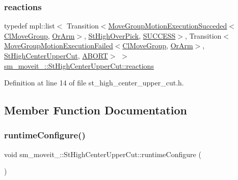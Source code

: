 \subsubsection{\texorpdfstring{reactions}{reactions}}
{\footnotesize\ttfamily typedef mpl\+::list$<$ Transition$<$\hyperlink{structmoveit__z__client_1_1MoveGroupMotionExecutionSucceded}{Move\+Group\+Motion\+Execution\+Succeded}$<$\hyperlink{classmoveit__z__client_1_1ClMoveGroup}{Cl\+Move\+Group}, \hyperlink{classsm__moveit__3_1_1OrArm}{Or\+Arm}$>$, \hyperlink{structsm__moveit__3_1_1StHighOverPick}{St\+High\+Over\+Pick}, \hyperlink{classSUCCESS}{S\+U\+C\+C\+E\+SS}$>$, Transition$<$\hyperlink{structmoveit__z__client_1_1MoveGroupMotionExecutionFailed}{Move\+Group\+Motion\+Execution\+Failed}$<$\hyperlink{classmoveit__z__client_1_1ClMoveGroup}{Cl\+Move\+Group}, \hyperlink{classsm__moveit__3_1_1OrArm}{Or\+Arm}$>$, \hyperlink{structsm__moveit__3_1_1StHighCenterUpperCut}{St\+High\+Center\+Upper\+Cut}, \hyperlink{classABORT}{A\+B\+O\+RT}$>$ $>$ \hyperlink{structsm__moveit__3_1_1StHighCenterUpperCut_a4985c365500d6acc2991ecf20c4476e7}{sm\+\_\+moveit\+\_\+::\+St\+High\+Center\+Upper\+Cut\+::reactions}}



Definition at line 14 of file st\+\_\+high\+\_\+center\+\_\+upper\+\_\+cut.\+h.



\subsection{Member Function Documentation}
\mbox{\label{structsm__moveit__3_1_1StHighCenterUpperCut_abf028817092539f6ba633e750d322bf0}} 
\subsubsection{\texorpdfstring{runtime\+Configure()}{runtimeConfigure()}}
{\footnotesize\ttfamily void sm\+\_\+moveit\+\_\+::\+St\+High\+Center\+Upper\+Cut\+::runtime\+Configure (\begin{DoxyParamCaption}{ }\end{DoxyParamCaption})\hspace{0.3cm}{\ttfamily [inline]}}




